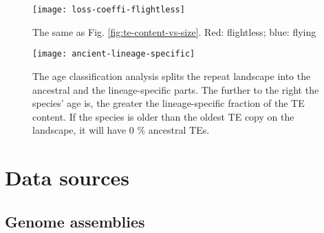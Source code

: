 \begin{figure}[h!]
\centering
\texttt{[image: loss-coeffi-flightless]}
\caption[TE content is a predictor for genome size, irrespective of flight ability]{The same as Fig. \ref{fig:te-content-vs-size}. Red: flightless; blue: flying}
\label{fig:loss-coefficient-plots-flight}
\end{figure}

\begin{figure}[h!]
\centering
\texttt{[image: ancient-lineage-specific]}
\caption[TE age classification explanation]{The age classification analysis splits the repeat landscape into the ancestral and the lineage-specific parts. The further to the right the species' age is, the greater the lineage-specific fraction of the TE content. If the species is older than the oldest TE copy on the landscape, it will have 0 \% ancestral TEs.}
\label{fig:ancient-lineage-specific}
\end{figure}

\clearpage

\section{Data sources}

\subsection{Genome assemblies}

